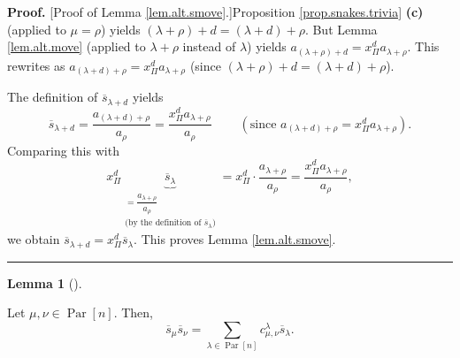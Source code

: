 \documentclass[numbers=enddot,12pt,final,onecolumn,notitlepage]{scrartcl}%
\theoremstyle{definition}
\newtheorem{lem}[theo]{Lemma}
\newenvironment{lemma}[1][]
{\begin{lem}[#1]\begin{leftbar}}
{\end{leftbar}\end{lem}}
\newenvironment{proof}[1][Proof]{\noindent\textbf{#1.} }{\ \rule{0.5em}{0.5em}}
\let\sumnonlimits\sum
\renewcommand{\sum}{\sumnonlimits\limits}
\begin{document}
\begin{proof}
[Proof of Lemma \ref{lem.alt.smove}.]Proposition \ref{prop.snakes.trivia}
\textbf{(c)} (applied to $\mu=\rho$) yields $\left(  \lambda+\rho\right)
+d=\left(  \lambda+d\right)  +\rho$. But Lemma \ref{lem.alt.move} (applied to
$\lambda+\rho$ instead of $\lambda$) yields $a_{\left(  \lambda+\rho\right)
+d}=x_{\Pi}^{d}a_{\lambda+\rho}$. This rewrites as $a_{\left(  \lambda
+d\right)  +\rho}=x_{\Pi}^{d}a_{\lambda+\rho}$ (since $\left(  \lambda
+\rho\right)  +d=\left(  \lambda+d\right)  +\rho$).

The definition of $\overline{s}_{\lambda+d}$ yields%
\[
\overline{s}_{\lambda+d}=\dfrac{a_{\left(  \lambda+d\right)  +\rho}}{a_{\rho}%
}=\dfrac{x_{\Pi}^{d}a_{\lambda+\rho}}{a_{\rho}}\ \ \ \ \ \ \ \ \ \ \left(
\text{since }a_{\left(  \lambda+d\right)  +\rho}=x_{\Pi}^{d}a_{\lambda+\rho
}\right)  .
\]
Comparing this with%
\[
x_{\Pi}^{d}\underbrace{\overline{s}_{\lambda}}_{\substack{=\dfrac
{a_{\lambda+\rho}}{a_{\rho}}\\\text{(by the definition of }\overline
{s}_{\lambda}\text{)}}}=x_{\Pi}^{d}\cdot\dfrac{a_{\lambda+\rho}}{a_{\rho}%
}=\dfrac{x_{\Pi}^{d}a_{\lambda+\rho}}{a_{\rho}},
\]
we obtain $\overline{s}_{\lambda+d}=x_{\Pi}^{d}\overline{s}_{\lambda}$. This
proves Lemma \ref{lem.alt.smove}.
\end{proof}

\begin{lemma}
\label{lem.alt.lrr}Let $\mu,\nu\in\operatorname*{Par}\left[  n\right]  $.
Then,%
\[
\overline{s}_{\mu}\overline{s}_{\nu}=\sum_{\lambda\in\operatorname*{Par}%
\left[  n\right]  }c_{\mu,\nu}^{\lambda}\overline{s}_{\lambda}.
\]

\end{lemma}
\end{document}
